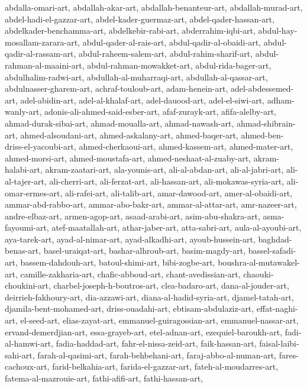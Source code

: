\documentclass{article}
\begin{document}
abdalla-omari-art,
abdallah-akar-art,
abdallah-benanteur-art,
abdallah-murad-art,
abdel-hadi-el-gazzar-art,
abdel-kader-guermaz-art,
abdel-qader-hassan-art,
abdelkader-benchamma-art,
abdelkebir-rabi-art,
abderrahim-iqbi-art,
abdul-hay-mosallam-zarara-art,
abdul-qader-al-rais-art,
abdul-qadir-al-obaidi-art,
abdul-qadir-al-rassam-art,
abdul-raheem-salem-art,
abdul-rahim-sharif-art,
abdul-rahman-al-maaini-art,
abdul-rahman-mowakket-art,
abdul-rida-bager-art,
abdulhalim-radwi-art,
abdullah-al-muharraqi-art,
abdullah-al-qassar-art,
abdulnasser-gharem-art,
achraf-touloub-art,
adam-henein-art,
adel-abdessemed-art,
adel-abidin-art,
adel-al-khalaf-art,
adel-dauood-art,
adel-el-siwi-art,
adham-wanly-art,
adonis-ali-ahmed-said-esber-art,
afaf-zurayk-art,
afifa-alelby-art,
ahmad-durak-sibai-art,
ahmad-moualla-art,
ahmad-nawash-art,
ahmad-shibrain-art,
ahmed-alsoudani-art,
ahmed-askalany-art,
ahmed-baqer-art,
ahmed-ben-driss-el-yacoubi-art,
ahmed-cherkaoui-art,
ahmed-kassem-art,
ahmed-mater-art,
ahmed-morsi-art,
ahmed-moustafa-art,
ahmed-neshaat-al-zuaby-art,
akram-halabi-art,
akram-zaatari-art,
ala-younis-art,
ali-al-abdan-art,
ali-al-jabri-art,
ali-al-tajer-art,
ali-cherri-art,
ali-ferzat-art,
ali-hassan-art,
ali-mokawas-syria-art,
ali-omar-ermes-art,
ali-rafei-art,
ali-talib-art,
amar-dawood-art,
amer-al-obaidi-art,
ammar-abd-rabbo-art,
ammar-abo-bakr-art,
ammar-al-attar-art,
amr-nazeer-art,
andre-elbaz-art,
armen-agop-art,
asaad-arabi-art,
asim-abu-shakra-art,
asma-fayoumi-art,
atef-maatallah-art,
athar-jaber-art,
atta-sabri-art,
aula-al-ayoubi-art,
aya-tarek-art,
ayad-al-nimar-art,
ayad-alkadhi-art,
ayoub-hussein-art,
baghdad-benas-art,
basel-uraiqat-art,
bashar-alhroub-art,
basim-magdy-art,
bassel-safadi-art,
bassem-dahdouh-art,
batoul-shimi-art,
bibi-zogbe-art,
boushra-al-mutawakel-art,
camille-zakharia-art,
chafic-abboud-art,
chant-avedissian-art,
chaouki-choukini-art,
charbel-joseph-h-boutros-art,
clea-badaro-art,
dana-al-jouder-art,
deirrieh-fakhoury-art,
dia-azzawi-art,
diana-al-hadid-syria-art,
djamel-tatah-art,
djamila-bent-mohamed-art,
driss-ouadahi-art,
ebtisam-abdulaziz-art,
effat-naghi-art,
el-seed-art,
elias-zayat-art,
emmanuel-guiragossian-art,
emmanuel-nassar-art,
ervand-demerdjian-art,
essa-grayeb-art,
etel-adnan-art,
ezequiel-baroukh-art,
fadi-al-hamwi-art,
fadia-haddad-art,
fahr-el-nissa-zeid-art,
faik-hassan-art,
faisal-laibi-sahi-art,
farah-al-qasimi-art,
farah-behbehani-art,
faraj-abbo-al-numan-art,
fares-cachoux-art,
farid-belkahia-art,
farida-el-gazzar-art,
fateh-al-moudarres-art,
fatema-al-mazrouie-art,
fathi-afifi-art,
fathi-hassan-art,
\end{document}
